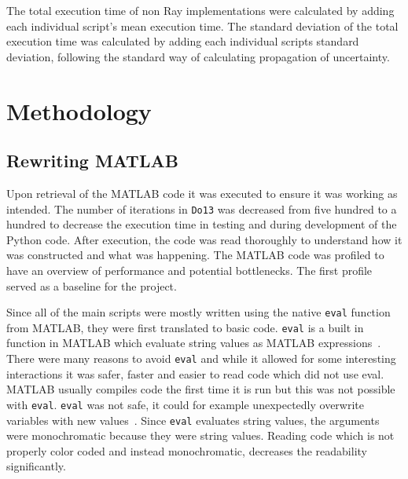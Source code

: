\documentclass[12pt, a4paper]{article}
\begin{document}
The total execution time of non Ray implementations were calculated by adding each individual script's mean execution time.
The standard deviation of the total execution time was calculated by adding each individual scripts standard deviation, following the standard way of calculating propagation of uncertainty.

\section{Methodology}

\subsection{Rewriting MATLAB}

Upon retrieval of the MATLAB code it was executed to ensure it was working as intended.
The number of iterations in \texttt{Do13} was decreased from five hundred to a hundred to decrease the execution time in testing and during development of the Python code.
After execution, the code was read thoroughly to understand how it was constructed and what was happening.
The MATLAB code was profiled to have an overview of performance and potential bottlenecks.
The first profile served as a baseline for the project.

Since all of the main scripts were mostly written using the native \texttt{eval} function from MATLAB, they were first translated to basic code.
\texttt{eval} is a built in function in MATLAB which evaluate string values as MATLAB expressions~\cite{mat:eval}.
There were many reasons to avoid \texttt{eval} and while it allowed for some interesting interactions it was safer, faster and easier to read code which did not use eval.
MATLAB usually compiles code the first time it is run but this was not possible with \texttt{eval}.
\texttt{eval} was not safe, it could for example unexpectedly overwrite variables with new values~\cite{matEval}.
Since \texttt{eval} evaluates string values, the arguments were monochromatic because they were string values.
Reading code which is not properly color coded and instead monochromatic, decreases the readability significantly.
\end{document}
